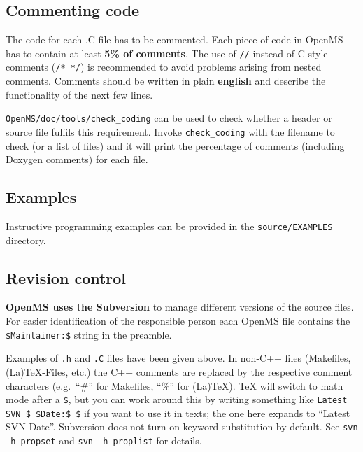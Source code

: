 \documentclass[a4]{article}
\begin{document}
\subsection{Commenting code}

The code for each .C file has to be commented. Each piece of code in OpenMS
has to contain at least {\bf 5\% of comments}. The use of {\tt //} instead of
C style comments ({\tt /* */}) is recommended to avoid problems arising from
nested comments. Comments should be written in plain \textbf{english} and
describe the functionality of the next few lines.

{\tt OpenMS/doc/tools/check\_coding} can be used to check whether a header or 
source file fulfils this requirement. Invoke {\tt check\_coding} with the
filename to check (or a list of files) and it will print the percentage of
comments (including Doxygen comments) for each file.


\subsection{Examples}

Instructive programming examples can be provided in the
\texttt{source/EXAMPLES} directory.


\subsection{Revision control}

\textbf{OpenMS uses the Subversion} to manage different
versions of the source files. For easier identification of the responsible person
each OpenMS file contains the \texttt{\$Maintainer{}:\$} string in the
preamble.

Examples of \texttt{.h} and \texttt{.C} files have been given above.  In
non-C++ files (Makefiles, (La)TeX-Files, etc.) the C++ comments are replaced
by the respective comment characters (e.g.\ ``\#'' for Makefiles, ``\%'' for
(La)TeX).  TeX will switch to math mode after a \texttt{\$}, but you can work
around this by writing something like
\mbox{\texttt{Latest SVN \$ \$Date{}:\$ \$}}
if you want to use it in texts; the one here expands to
%
%
``Latest SVN $ $Date$ $''. %
%
Subversion does not turn on keyword substitution by default.  See \texttt{svn
  -h propset} and \texttt{svn -h proplist} for details.
\end{document}
